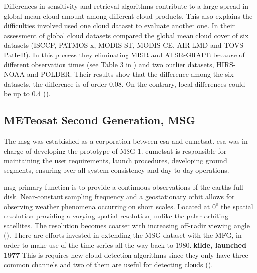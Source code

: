 Differences in sensitivity and retrieval algorithms contribute to a large spread in global mean cloud amount among different cloud products. This also explains the difficulties involved used one cloud dataset to evaluate another one. In their assessment of global cloud datasets \citeauthor{Stubenrauch2013AssessmentPanel} compared the global mean cloud cover of six datasets (ISCCP, PATMOS-x, MODIS-ST, MODIS-CE, AIR-LMD and TOVS Path-B). In this process they eliminating MISR and ATSR-GRAPE because of different observation times (see Table 3 in \cite{Stubenrauch2013AssessmentPanel} ) and two outlier datasets, HIRS-NOAA and POLDER. Their results show that the difference among the six datasets, the difference is of order 0.08. On the contrary, local differences could be up to 0.4 (\cite{Stubenrauch2013AssessmentPanel}). 


\subsection{METeosat Second Generation, MSG} \label{sec:meteosat}
The \acrfull{msg} was established as a corporation between \acrfull{esa} and \acrfull{eumetsat}. \acrshort{esa} was in charge of developing the prototype of MSG-1. \acrshort{eumetsat} is responsible for maintaining the user requirements, launch procedures, developing ground segments, ensuring over all system consistency and day to day operations. 

\acrshort{msg} primary function is to provide a continuous observations of the earths full disk. Near-constant sampling frequency and a geostationary orbit allows for observing weather phenomena occurring on short scales. Located at $0^o$ the spatial resolution providing a varying spatial resolution, unlike the polar orbiting satellites. The resolution becomes coarser with increasing off-nadir viewing angle (\cite{Stubenrauch2013AssessmentPanel}). There are efforts invested in extending the MSG dataset with the MFG, in order to make use of the time series all the way back to 1980. \textbf{kilde, launched 1977} This is requires new cloud detection algorithms since they only have three common channels and two of them are useful for detecting clouds (\cite{Stockli2019CloudApplications}). 

